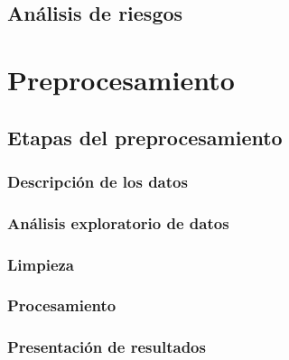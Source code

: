 \documentclass[12pt,letterpaper]{report}
\begin{document}
\section{Análisis de riesgos}
\label{sec:analisis-riesgos}


\chapter{Preprocesamiento}
\section{Etapas del preprocesamiento}
\subsection{Descripción de los datos}

\subsection{Análisis exploratorio de datos}
\label{subsec:analisis_exploratorio_datos}

\subsection{Limpieza}

\subsection{Procesamiento}

\subsection{Presentación de resultados}



\end{document}
